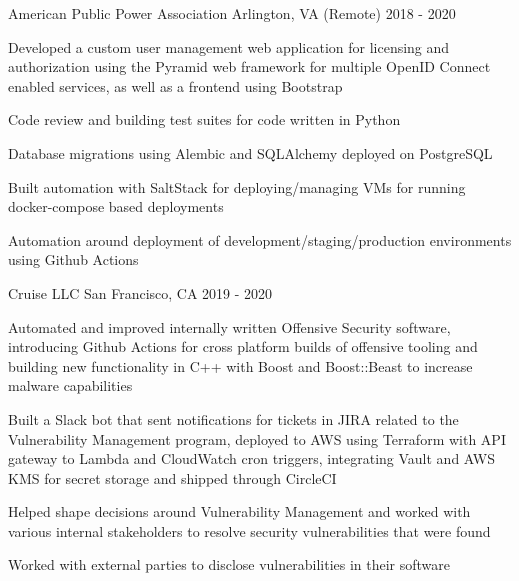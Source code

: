 \documentclass{resume}
\begin{document}
            {American Public Power Association}
            {Arlington, VA (Remote)}
            {2018 - 2020}
\begin{resumeItems}
\item Developed a custom user management web application for licensing and authorization using the Pyramid web framework for multiple OpenID Connect enabled services, as well as a frontend using Bootstrap
\item Code review and building test suites for code written in Python
\item Database migrations using Alembic and SQLAlchemy deployed on PostgreSQL
\item Built automation with SaltStack for deploying/managing VMs for running docker-compose based deployments
\item Automation around deployment of development/staging/production environments using Github Actions
\end{resumeItems}

            {Cruise LLC}
            {San Francisco, CA}
            {2019 - 2020}
\begin{resumeItems}
\item Automated and improved internally written Offensive Security software, introducing Github Actions for cross platform builds of offensive tooling and building new functionality in C++ with Boost and Boost::Beast to increase malware capabilities
\item Built a Slack bot that sent notifications for tickets in JIRA related to the Vulnerability Management program, deployed to AWS using Terraform with API gateway to Lambda and CloudWatch cron triggers, integrating Vault and AWS KMS for secret storage and shipped through CircleCI
\item Helped shape decisions around Vulnerability Management and worked with various internal stakeholders to resolve security vulnerabilities that were found
\item Worked with external parties to disclose vulnerabilities in their software
\end{resumeItems}
\end{document}
